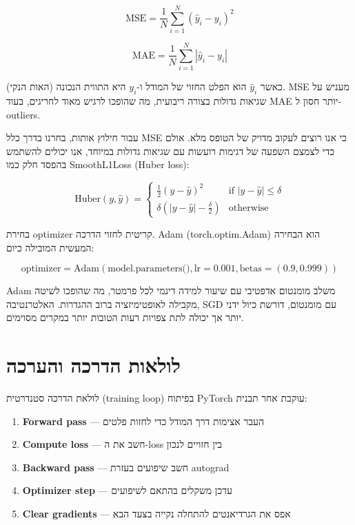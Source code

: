 \begin{equation}
\text{MSE} = \frac{1}{N} \sum_{i=1}^{N} (\hat{y}_i - y_i)^2
\end{equation}

\begin{equation}
\text{MAE} = \frac{1}{N} \sum_{i=1}^{N} |\hat{y}_i - y_i|
\end{equation}

כאשר \(\hat{y}_i\) הוא הפלט החזוי של המודל ו-\(y_i\) היא התווית הנכונה (האות הנקי). MSE מעניש על שגיאות גדולות בצורה ריבועית, מה שהופכו לרגיש מאוד לחריגים, בעוד MAE יותר חסון ל-outliers.

עבור חילוץ אותות, בחרנו בדרך כלל \textenglish{MSE} כי אנו רוצים לעקוב מדויק של הטופס מלא. אולם כדי לצמצם השפעה של דגימות רועשות עם שגיאות גדולות במיוחד, אנו יכולים להשתמש בהפסד חלק כמו \textenglish{SmoothL1Loss} (Huber loss):

\begin{equation}
\text{Huber}(y, \hat{y}) = \begin{cases}
\frac{1}{2}(y - \hat{y})^2 & \text{if } |y - \hat{y}| \le \delta \\
\delta(|y - \hat{y}| - \frac{\delta}{2}) & \text{otherwise}
\end{cases}
\end{equation}

בחירת \textenglish{optimizer} קריטית לחזוי הדרכה. Adam (\textenglish{torch.optim.Adam}) הוא הבחירה המעשית המובילה כיום:

\begin{equation}
\text{optimizer} = \text{Adam}(\text{model.parameters()}, \text{lr}=0.001, \text{betas}=(0.9, 0.999))
\end{equation}

Adam משלב מומנטום אדפטיבי עם שיעור למידה דינמי לכל פרמטר, מה שהופכו לשיטה מקבילה לאופטימיזציה ברוב ההגדרות. האלטרנטיבה, SGD עם מומנטום, דורשת כיול ידני יותר אך יכולה לתת צפויות רעות הטובות יותר במקרים מסוימים.

\section{לולאות הדרכה והערכה}

לולאת הדרכה סטנדרטית (training loop) בפיתוח PyTorch עוקבת אחר תבנית:

\begin{enumerate}
\item \textbf{Forward pass} --- העבר אצימות דרך המודל כדי לחזות פלטים
\item \textbf{Compute loss} --- חשב את ה-loss בין חזויים לנכון
\item \textbf{Backward pass} --- חשב שיפועים בעזרת autograd
\item \textbf{Optimizer step} --- עדכן משקלים בהתאם לשיפועים
\item \textbf{Clear gradients} --- אפס את הגרדיאנטים להתחלה נקייה בצעד הבא
\end{enumerate}

